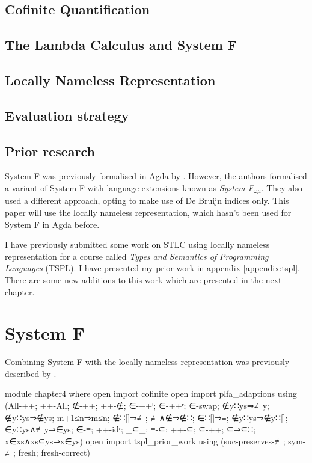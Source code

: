 \documentclass[logo,bsc,singlespacing,parskip,online]{infthesis}
\begin{document}
\section{Cofinite Quantification}



\section{The Lambda Calculus and System F}


\section{Locally Nameless Representation}


\section{Evaluation strategy}
\label{background:evaluation_strategy}


\section{Prior research}
System F was previously formalised in Agda by \citet{hutton_system_2019}. However, the authors
formalised a variant of System F with language extensions known as \textit{System F$_{\omega \mu}$}.
They also used a different approach, opting to make use of De Bruijn indices only. This paper will
use the locally nameless representation, which hasn't been used for System F in Agda before.

I have previously submitted some work on STLC using locally nameless representation for a course
called \textit{Types and Semantics of Programming Languages} (TSPL). I have presented my prior work
in appendix \ref{appendix:tspl}. There are some new additions to this work which are presented in
the next chapter.

\chapter{System F}
Combining System F with the locally nameless representation was previously described by
\citet{chargueraud_locally_2012}.
\begin{code}
module chapter4 where
  open import cofinite
  open import plfa_adaptions using (All-++; ++-All; ∉-++;
    ++-∉; ∈-++ˡ; ∈-++ʳ; ∈-swap; ∉y∷ys⇒≢y; ∉y∷ys⇒∉ys;
    m+1≤n⇒m≤n; ∉∷[]⇒≢; ≢∧∉⇒∉∷; ∈∷[]⇒≡; ∉y∷ys⇒∉y∷[];
    ∈y∷ys∧≢y⇒∈ys; ∈-≡; ++-idʳ; _⊆_; ≡-⊆; ++-⊆; ⊆-++; ⊆⇒⊆∷;
    x∈xs∧xs⊆ys⇒x∈ys)
  open import tspl_prior_work
    using (suc-preserves-≢; sym-≢; fresh; fresh-correct)
\end{code}
\end{document}
